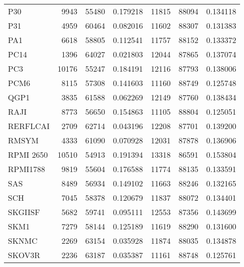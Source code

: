 \begin{tabular}{lrrrrrr}
                                  P30 &      9943 &    55480 &  0.179218 &     11815 &    88094 &  0.134118 \\
                                  P31 &      4959 &    60464 &  0.082016 &     11602 &    88307 &  0.131383 \\
                                  PA1 &      6618 &    58805 &  0.112541 &     11757 &    88152 &  0.133372 \\
                                 PC14 &      1396 &    64027 &  0.021803 &     12044 &    87865 &  0.137074 \\
                                  PC3 &     10176 &    55247 &  0.184191 &     12116 &    87793 &  0.138006 \\
                                 PCM6 &      8115 &    57308 &  0.141603 &     11160 &    88749 &  0.125748 \\
                                 QGP1 &      3835 &    61588 &  0.062269 &     12149 &    87760 &  0.138434 \\
                                 RAJI &      8773 &    56650 &  0.154863 &     11105 &    88804 &  0.125051 \\
                             RERFLCAI &      2709 &    62714 &  0.043196 &     12208 &    87701 &  0.139200 \\
                                RMSYM &      4333 &    61090 &  0.070928 &     12031 &    87878 &  0.136906 \\
                            RPMI 2650 &     10510 &    54913 &  0.191394 &     13318 &    86591 &  0.153804 \\
                             RPMI1788 &      9819 &    55604 &  0.176588 &     11774 &    88135 &  0.133591 \\
                                  SAS &      8489 &    56934 &  0.149102 &     11663 &    88246 &  0.132165 \\
                                  SCH &      7045 &    58378 &  0.120679 &     11837 &    88072 &  0.134401 \\
                              SKGIISF &      5682 &    59741 &  0.095111 &     12553 &    87356 &  0.143699 \\
                                 SKM1 &      7279 &    58144 &  0.125189 &     11619 &    88290 &  0.131600 \\
                                SKNMC &      2269 &    63154 &  0.035928 &     11874 &    88035 &  0.134878 \\
                               SKOV3R &      2236 &    63187 &  0.035387 &     11161 &    88748 &  0.125761 \\

\end{tabular}
